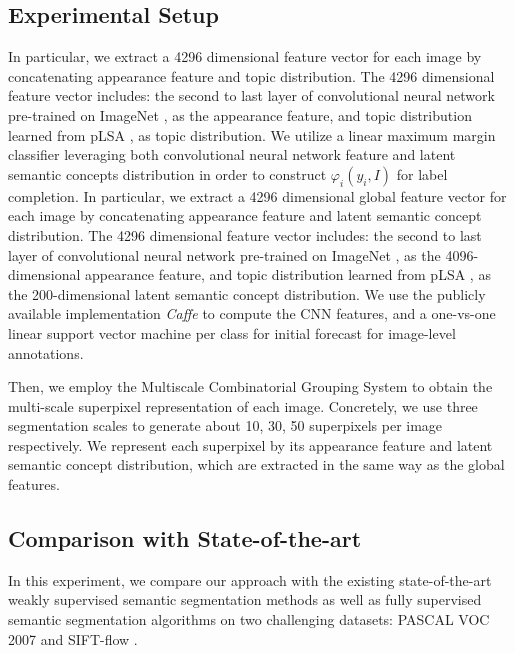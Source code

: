 \subsection{Experimental Setup}
\if
In particular, we extract a 4296 dimensional feature vector for each image by concatenating appearance feature and topic distribution. The 4296 dimensional feature vector includes: the second to last layer of convolutional neural network \cite{simonyan2014very} pre-trained on ImageNet \cite{russakovsky2014imagenet}, as the appearance feature, and topic distribution learned from pLSA \cite{hofmann1999probabilistic}, as topic distribution.
\fi
We utilize a linear maximum margin classifier leveraging both convolutional neural network feature and latent semantic concepts distribution in order to construct $\varphi_{i}(y_i,I)$ for label completion. In particular, we extract a 4296 dimensional global feature vector for each image by concatenating appearance feature and latent semantic concept distribution. The 4296 dimensional feature vector includes: the second to last layer of convolutional neural network \cite{simonyan2014very} pre-trained on ImageNet \cite{russakovsky2014imagenet}, as the 4096-dimensional appearance feature, and topic distribution learned from pLSA \cite{hofmann1999probabilistic}, as the 200-dimensional latent semantic concept distribution. We use the publicly available implementation \emph{Caffe} \cite{jia2014caffe} to compute the CNN features, and a one-vs-one linear support vector machine \cite{fan2008liblinear} per class for initial forecast for image-level annotations.

Then, we employ the Multiscale Combinatorial Grouping System \cite{arbelaez2014multiscale} to obtain the multi-scale superpixel representation of each image. Concretely, we use three segmentation scales to generate about 10, 30, 50 superpixels per image respectively. We represent each superpixel by its appearance feature and latent semantic concept distribution, which are extracted in the same way as the global features.

\subsection{Comparison with State-of-the-art}
In this experiment, we compare our approach with the existing state-of-the-art weakly supervised semantic segmentation methods as well as fully supervised semantic segmentation algorithms on two challenging datasets: PASCAL VOC 2007 \cite{pascal-voc-2007} and SIFT-flow \cite{liu2011nonparametric}.

